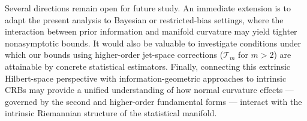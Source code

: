 \documentclass[pdflatex,sn-mathphys-num]{sn-jnl}%
\theoremstyle{thmstyleone}%
\theoremstyle{thmstyletwo}%
\theoremstyle{thmstylethree}%
\begin{document}
Several directions remain open for future study. An immediate extension is to adapt the present analysis to Bayesian or restricted-bias settings, where the interaction between prior information and manifold curvature may yield tighter nonasymptotic bounds. It would also be valuable to investigate conditions under which our bounds using higher-order jet-space corrections ($\mathcal{T}_m$ for $m > 2$) are attainable by concrete statistical estimators. Finally, connecting this extrinsic Hilbert-space perspective with information-geometric approaches to intrinsic CRBs may provide a unified understanding of how normal curvature effects — governed by the second and higher-order fundamental forms — interact with the intrinsic Riemannian structure of the statistical manifold.


\end{document}
